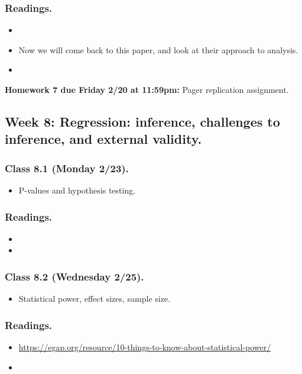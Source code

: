 \documentclass[letterpaper, 12pt, parskip=full,DIV=10]{scrartcl}
\begin{document}
\subsubsection*{Readings.}
\begin{itemize}
\item {}
\item Now we will come back to this paper, and look at their approach to analysis.
\item {}
\end{itemize}

\textbf{Homework 7 due Friday 2/20 at 11:59pm:}
Pager replication assignment.

\subsection*{Week 8: Regression: inference, challenges to inference, and external validity.}
\subsubsection*{Class 8.1 (Monday 2/23).}
\begin{itemize}
\item P-values and hypothesis testing.
\end{itemize}

\subsubsection*{Readings.}
\begin{itemize}
\item {}
\item {}
\end{itemize}

\subsubsection*{Class 8.2 (Wednesday 2/25).}
\begin{itemize}
\item Statistical power, effect sizes, sample size.
\end{itemize}

\subsubsection*{Readings.}
\begin{itemize}
\item {} \url{https://egap.org/resource/10-things-to-know-about-statistical-power/}
\item {}
\end{itemize}
\end{document}
